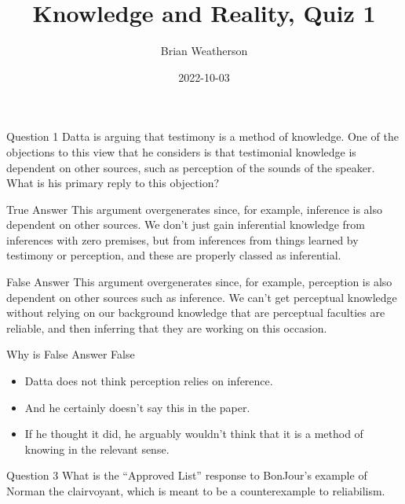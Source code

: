 \documentclass[
  17pt,
  letterpaper,
  ignorenonframetext,
  aspectratio=169,
]{beamer}
\title{Knowledge and Reality, Quiz 1}
\author{Brian Weatherson}
\date{2022-10-03}
\providecommand{\tightlist}{%
  \setlength{\itemsep}{0pt}\setlength{\parskip}{0pt}}\usepackage{longtable,booktabs,array}
\begin{document}
\frame{\titlepage}
\ifdefined\Shaded\renewenvironment{Shaded}{\begin{tcolorbox}[sharp corners, borderline west={3pt}{0pt}{shadecolor}, breakable, frame hidden, enhanced, boxrule=0pt, interior hidden]}{\end{tcolorbox}}\fi

\begin{frame}{Question 1}
\protect\hypertarget{question-1}{}
Datta is arguing that testimony is a method of knowledge. One of the
objections to this view that he considers is that testimonial knowledge
is dependent on other sources, such as perception of the sounds of the
speaker. What is his primary reply to this objection?
\end{frame}

\begin{frame}{True Answer}
\protect\hypertarget{true-answer}{}
This argument overgenerates since, for example, inference is also
dependent on other sources. We don't just gain inferential knowledge
from inferences with zero premises, but from inferences from things
learned by testimony or perception, and these are properly classed as
inferential.
\end{frame}

\begin{frame}{False Answer}
\protect\hypertarget{false-answer}{}
This argument overgenerates since, for example, perception is also
dependent on other sources such as inference. We can't get perceptual
knowledge without relying on our background knowledge that are
perceptual faculties are reliable, and then inferring that they are
working on this occasion.
\end{frame}

\begin{frame}{Why is False Answer False}
\protect\hypertarget{why-is-false-answer-false}{}
\begin{itemize}[<+->]
\tightlist
\item
  Datta does not think perception relies on inference.
\item
  And he certainly doesn't say this in the paper.
\item
  If he thought it did, he arguably wouldn't think that it is a method
  of knowing in the relevant sense.
\end{itemize}
\end{frame}

\begin{frame}{Question 3}
\protect\hypertarget{question-3}{}
What is the ``Approved List'' response to BonJour's example of Norman
the clairvoyant, which is meant to be a counterexample to reliabilism.
\end{frame}
\end{document}
